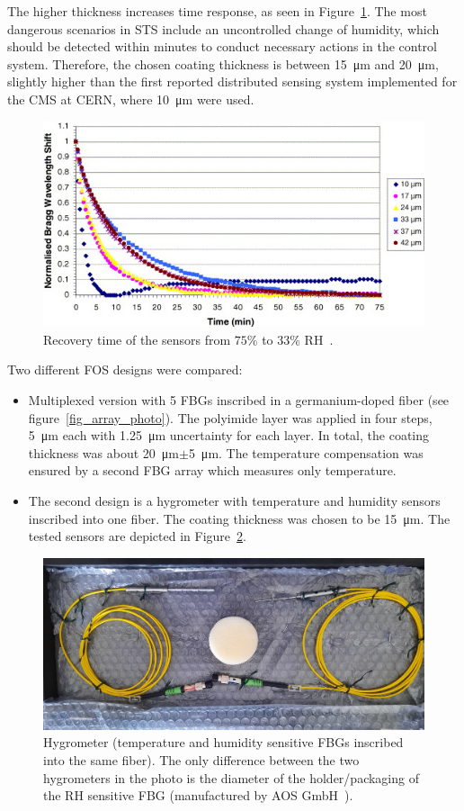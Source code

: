 The higher thickness increases time response, as seen in Figure~\ref{fig:yeo2}. The most dangerous scenarios in \gls{STS} include an uncontrolled change of humidity, which should be detected within minutes to conduct necessary actions in the control system. Therefore, the chosen coating thickness is between \SI{15}{\micro\metre} and \SI{20}{\micro\metre}, slightly higher than the first reported distributed sensing system implemented for the \gls{CMS} at \gls{CERN}, where \SI{10}{\micro\metre} were used. 
\begin{figure}[!h]
\centering
\includegraphics[width=0.80\columnwidth]{Chapter5/images/time_response_yeo.jpg}
\caption{Recovery time of the sensors from $75$\% to $33$\% RH~\cite{YEO_PI}.}
\label{fig:yeo2}
\end{figure}
\newpage
Two different \gls{FOS} designs were compared:
\begin{itemize}
    \item Multiplexed version with 5 \glspl{FBG} inscribed in a germanium-doped fiber (see figure~\ref{fig_array_photo}). The polyimide layer was applied in four steps, \SI{5}{\micro\metre} each with \SI{1.25}{\micro\metre} uncertainty for each layer. In total, the coating thickness was about \SI{20}{\micro\metre}$\pm$\SI{5}{\micro\metre}. The temperature compensation was ensured by a second \gls{FBG} array which measures only temperature.
    \item The second design is a hygrometer with temperature and humidity sensors inscribed into one fiber. The coating thickness was chosen to be \SI{15}{\micro\metre}. The tested sensors are depicted in Figure~\ref{fig_single_photo}.
\end{itemize}

\begin{figure}[!h]
\centering
\includegraphics[width=0.7\columnwidth]{Chapter5/images/single1.jpeg}
\caption{Hygrometer (temperature and humidity sensitive \glspl{FBG} inscribed into the same fiber). The only difference between the two hygrometers in the photo is the diameter of the holder/packaging of the \gls{RH} sensitive \gls{FBG} (manufactured by AOS GmbH~\cite{AOS}).}
\label{fig_single_photo}
\end{figure}

